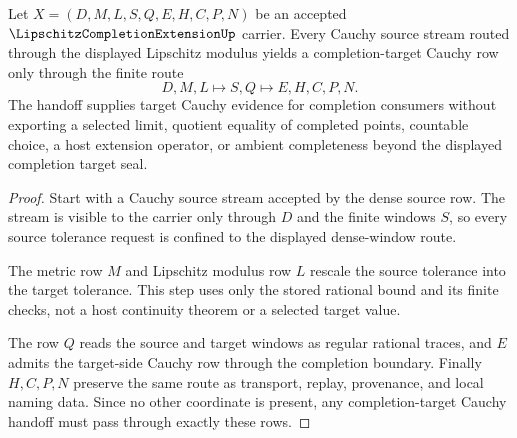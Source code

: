 \begin{theorem}
\label{thm:lipschitz-completion-extension-cauchy-handoff}
Let $X=(D,M,L,S,Q,E,H,C,P,N)$ be an accepted $\LipschitzCompletionExtensionUp$ carrier. Every Cauchy source stream routed through the displayed Lipschitz modulus yields a completion-target Cauchy row only through the finite route
$$
D,M,L \longmapsto S,Q \longmapsto E,H,C,P,N .
$$
The handoff supplies target Cauchy evidence for completion consumers without exporting a selected limit, quotient equality of completed points, countable choice, a host extension operator, or ambient completeness beyond the displayed completion target seal.
\end{theorem}
\begin{proof}
Start with a Cauchy source stream accepted by the dense source row. The stream is visible to the carrier only through $D$ and the finite windows $S$, so every source tolerance request is confined to the displayed dense-window route.

The metric row $M$ and Lipschitz modulus row $L$ rescale the source tolerance into the target tolerance. This step uses only the stored rational bound and its finite checks, not a host continuity theorem or a selected target value.

The row $Q$ reads the source and target windows as regular rational traces, and $E$ admits the target-side Cauchy row through the completion boundary. Finally $H,C,P,N$ preserve the same route as transport, replay, provenance, and local naming data. Since no other coordinate is present, any completion-target Cauchy handoff must pass through exactly these rows.
\end{proof}



